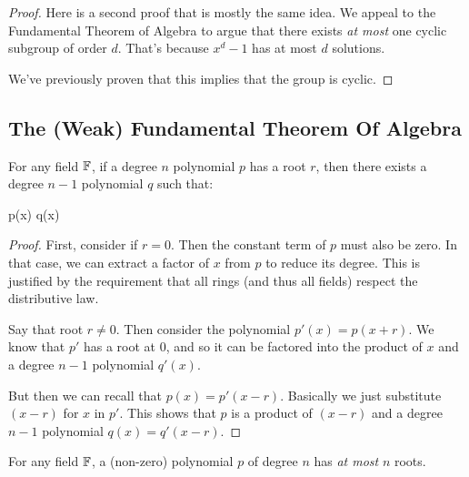 \begin{proof}
  Here is a second proof that is mostly the same idea. We appeal to the
  Fundamental Theorem of Algebra to argue that there exists \emph{at
  most} one cyclic subgroup of order $d$. That's because $x^d - 1$ has
  at most $d$ solutions.

  We've previously proven that this implies that the group is cyclic.
\end{proof}

\subsection{The (Weak) Fundamental Theorem Of Algebra}

\begin{lemma}
  For any field $\mathbb{F}$, if a degree $n$ polynomial $p$ has a root $r$,
  then there exists a degree $n-1$ polynomial $q$ such that:

  \begin{nedqn}
    p(x)
  \eqcol
    q(x)
  \end{nedqn}
\end{lemma}

\begin{proof}
  First, consider if $r = 0$. Then the constant term of $p$ must also be
  zero. In that case, we can extract a factor of $x$ from $p$ to reduce
  its degree. This is justified by the requirement that all rings (and
  thus all fields) respect the distributive law.

  Say that root $r \ne 0$. Then consider the polynomial $p'(x) = p(x +
  r)$. We know that $p'$ has a root at 0, and so it can be factored into
  the product of $x$ and a degree $n-1$ polynomial $q'(x)$.

  But then we can recall that $p(x) = p'(x - r)$. Basically we just
  substitute $(x-r)$ for $x$ in $p'$. This shows that $p$ is a product
  of $(x - r)$ and a degree $n-1$ polynomial $q(x) = q'(x - r)$.
\end{proof}

\begin{lemma}
  For any field $\mathbb{F}$, a (non-zero) polynomial $p$ of degree $n$ has
  \emph{at most} $n$ roots.
\end{lemma}

